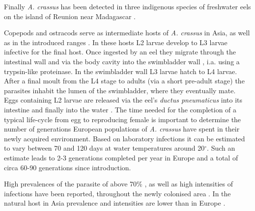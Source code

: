 Finally \textit{A. crassus} has been detected in three indigenous
species of freshwater eels on the island of Reunion near Madagascar
\cite{sasal_parasite_2008}.

Copepods and ostracods serve as intermediate hosts of
\textit{A. crassus} in Asia, as well as in the introduced ranges
\cite{moravec_first_2005}. In these hosts L2 larvae develop to L3
larvae infective for the final host. Once ingested by an eel they
migrate through the intestinal wall and via the body cavity into the
swimbladder wall \cite{haenen_effects_1996}, i.a. using a trypsin-like
proteinase\cite{polzer_identification_1993}. In the swimbladder wall
L3 larvae hatch to L4 larvae. After a final moult from the L4 stage to
adults (via a short pre-adult stage) the parasites inhabit the lumen
of the swimbladder, where they eventually mate. Eggs containing L2
larvae are released via the eel's \textit{ductus pneumaticus} into its
intestine and finally into the water
\cite{de_charleroy_life_1990}. The time needed for the completion of a
typical life-cycle from egg to reproducing female is important to
determine the number of generations European populations of
\textit{A. crassus} have spent in their newly acquired
environment. Based on laboratory infections it can be estimated to
vary between 70 and 120 days at water temperatures around
20$^{\circ}$.  Such an estimate leads to 2-3 generations completed per
year in Europe and a total of circa 60-90 generations since
introduction.



High prevalences of the parasite of above 70\%
\cite{wrtz_distribution_1998,thomas1992population}, as well as high
intensities of infections have been reported, throughout the newly
colonised area \cite{lefebvre_anguillicolosis:_2004}. In the natural
host in Asia prevalence and intensities are lower than in Europe
\cite{mnderle_occurrence_2006}.

